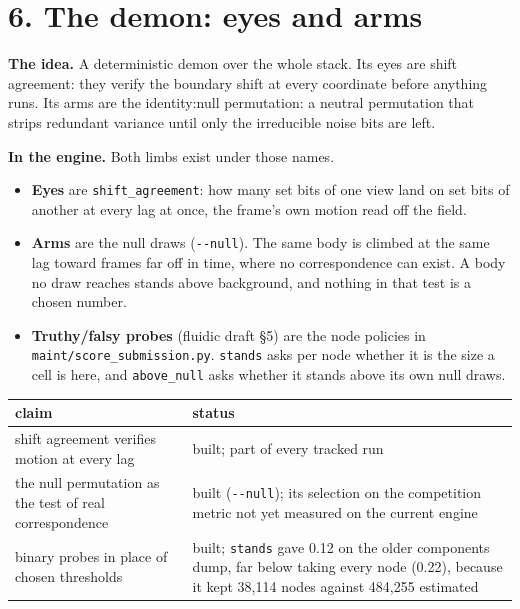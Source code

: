 \section{\texorpdfstring{6. The demon: eyes and arms}{6. The demon: eyes and arms}}

\textbf{The idea.} A deterministic demon over the whole stack. Its eyes are shift agreement: they verify the boundary shift at every coordinate before anything runs. Its arms are the identity:null permutation: a neutral permutation that strips redundant variance until only the irreducible noise bits are left.

\textbf{In the engine.} Both limbs exist under those names.

\begin{itemize}
\item \textbf{Eyes} are \texttt{shift\_\allowbreak{}agreement}: how many set bits of one view land on set bits of another at every lag at once, the frame's own motion read off the field.
\item \textbf{Arms} are the null draws (\texttt{-\allowbreak{}-\allowbreak{}null}). The same body is climbed at the same lag toward frames far off in time, where no correspondence can exist. A body no draw reaches stands above background, and nothing in that test is a chosen number.
\item \textbf{Truthy/falsy probes} (fluidic draft §5) are the node policies in \texttt{maint/\allowbreak{}score\_\allowbreak{}submission.\allowbreak{}py}. \texttt{stands} asks per node whether it is the size a cell is here, and \texttt{above\_\allowbreak{}null} asks whether it stands above its own null draws.
\end{itemize}

{\small
\setlength{\tabcolsep}{6pt}
\begin{longtable}{>{\RaggedRight\arraybackslash}p{}>{\RaggedRight\arraybackslash}p{}}
\toprule
claim & status \\
\midrule
\endhead
shift agreement verifies motion at every lag & built; part of every tracked run \\
the null permutation as the test of real correspondence & built (\texttt{-\allowbreak{}-\allowbreak{}null}); its selection on the competition metric not yet measured on the current engine \\
binary probes in place of chosen thresholds & built; \texttt{stands} gave 0.12 on the older components dump, far below taking every node (0.22), because it kept 38,114 nodes against 484,255 estimated \\
\bottomrule
\end{longtable}
}

